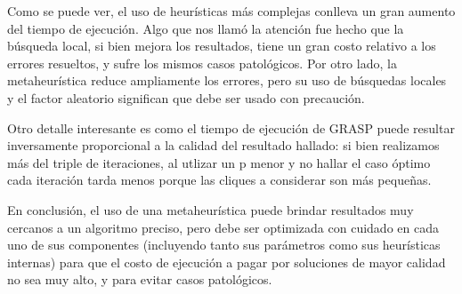 Como se puede ver, el uso de heurísticas más complejas conlleva un gran aumento del tiempo de ejecución. Algo que nos llamó la atención fue hecho que la búsqueda local, si bien mejora los resultados, tiene un gran costo relativo a los errores resueltos, y sufre los mismos casos patológicos. Por otro lado, la metaheurística reduce ampliamente los errores, pero su uso de búsquedas locales y el factor aleatorio significan que debe ser usado con precaución.

Otro detalle interesante es como el tiempo de ejecución de GRASP puede resultar inversamente proporcional a la calidad del resultado hallado: si bien realizamos más del triple de iteraciones, al utlizar un p menor y no hallar el caso óptimo cada iteración tarda menos porque las cliques a considerar son más pequeñas.

En conclusión, el uso de una metaheurística puede brindar resultados muy cercanos a un algoritmo preciso, pero debe ser optimizada con cuidado en cada uno de sus componentes (incluyendo tanto sus parámetros como sus heurísticas internas) para que el costo de ejecución a pagar por soluciones de mayor calidad no sea muy alto, y para evitar casos patológicos.
